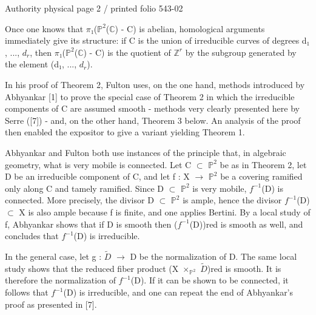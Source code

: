 \documentclass[10pt,a4paper]{article}
\begin{document}
\noindent\begin{adjustbox}{max totalsize={\textwidth}{0.945\textheight},center}
\begin{minipage}{\textwidth}
\noindent\hfill\scriptsize Authority physical page 2 / printed folio 543-02\par\normalsize
\noindent Once one knows that \ensuremath{π₁}(\ensuremath{ℙ^2}(\ensuremath{ℂ}) - C) is abelian, homological arguments immediately give its structure: if C is the union of irreducible curves of degrees d\ensuremath{₁}, ..., \ensuremath{d_r}, then \ensuremath{π₁}(\ensuremath{ℙ^2}(\ensuremath{ℂ}) - C) is the quotient of \ensuremath{ℤ^r} by the subgroup generated by the element (d\ensuremath{₁}, ..., \ensuremath{d_r}).\par\smallskip
\noindent In his proof of Theorem 2, Fulton uses, on the one hand, methods introduced by Abhyankar [1] to prove the special case of Theorem 2 in which the irreducible components of C are assumed smooth - methods very clearly presented here by Serre ([7]) - and, on the other hand, Theorem 3 below. An analysis of the proof then enabled the expositor to give a variant yielding Theorem 1.\par\smallskip
\noindent Abhyankar and Fulton both use instances of the principle that, in algebraic geometry, what is very mobile is connected. Let C \ensuremath{⊂} \ensuremath{ℙ^2} be as in Theorem 2, let D be an irreducible component of C, and let f : X \ensuremath{→} \ensuremath{ℙ^2} be a covering ramified only along C and tamely ramified. Since D \ensuremath{⊂} \ensuremath{ℙ^2} is very mobile, \ensuremath{f^{-1}}(D) is connected. More precisely, the divisor D \ensuremath{⊂} \ensuremath{ℙ^2} is ample, hence the divisor \ensuremath{f^{-1}}(D) \ensuremath{⊂} X is also ample because f is finite, and one applies Bertini. By a local study of f, Abhyankar shows that if D is smooth then (\ensuremath{f^{-1}}(D))red is smooth as well, and concludes that \ensuremath{f^{-1}}(D) is irreducible.\par\smallskip
\noindent In the general case, let g : \ensuremath{\widetilde{D}} \ensuremath{→} D be the normalization of D. The same local study shows that the reduced fiber product (X \ensuremath{×_{ℙ^2}} \ensuremath{\widetilde{D}})red is smooth. It is therefore the normalization of \ensuremath{f^{-1}}(D). If it can be shown to be connected, it follows that \ensuremath{f^{-1}}(D) is irreducible, and one can repeat the end of Abhyankar's proof as presented in [7].\par\smallskip

\end{minipage}
\end{adjustbox}
\end{document}
